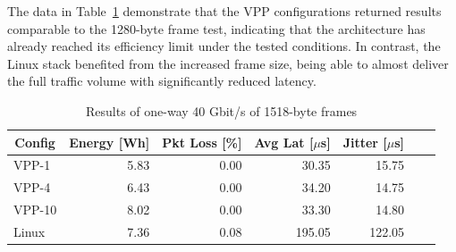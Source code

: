 The data in Table~\ref{tab:40udp:1518B} demonstrate that the VPP configurations returned results comparable to the 1280-byte frame test,
indicating that the architecture has already reached its efficiency limit under the tested conditions.
In contrast, the Linux stack benefited from the increased frame size, being able to almost deliver the full traffic volume with significantly reduced latency.

\begin{table}[h!]
\centering
\caption{Results of one-way 40 Gbit/s of 1518-byte frames}
\begin{tabular}{|l|r|r|r|r|r|r|}
\hline
\multicolumn{1}{|c|}{\textbf{Config}} &
\multicolumn{1}{c|}{\textbf{Energy [Wh] }} &
\multicolumn{1}{c|}{\textbf{Pkt Loss [\%]}} &
\multicolumn{1}{c|}{\textbf{Avg Lat [$\mu$s]}} &
\multicolumn{1}{c|}{\textbf{Jitter [$\mu$s]}} \\
\hline 
VPP-1 & 5.83 & 0.00 & 30.35 & 15.75 \\
VPP-4 & 6.43 & 0.00 & 34.20 & 14.75 \\
VPP-10 & 8.02 & 0.00 & 33.30 & 14.80 \\
Linux & 7.36 & 0.08 & 195.05 & 122.05 \\
\hline
\end{tabular}
\label{tab:40udp:1518B}
\end{table}









